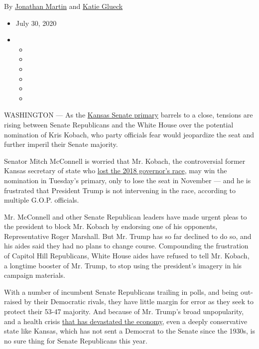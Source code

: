 By \href{https://www.nytimes3xbfgragh.onion/by/jonathan-martin}{Jonathan
Martin} and
\href{https://www.nytimes3xbfgragh.onion/by/katie-glueck}{Katie Glueck}

\begin{itemize}
\item
  July 30, 2020
\item
  \begin{itemize}
  \item
  \item
  \item
  \item
  \item
  \item
  \end{itemize}
\end{itemize}

WASHINGTON --- As the
\href{https://www.nytimes3xbfgragh.onion/2020/08/04/us/elections/primary-election-michigan-arizona-kansas.html}{Kansas
Senate primary} barrels to a close, tensions are rising between Senate
Republicans and the White House over the potential nomination of Kris
Kobach, who party officials fear would jeopardize the seat and further
imperil their Senate majority.

Senator Mitch McConnell is worried that Mr. Kobach, the controversial
former Kansas secretary of state who
\href{https://www.nytimes3xbfgragh.onion/2018/11/06/us/laura-kelly-wins-kansas-governors-race.html}{lost
the 2018 governor's race}, may win the nomination in Tuesday's primary,
only to lose the seat in November --- and he is frustrated that
President Trump is not intervening in the race, according to multiple
G.O.P. officials.

Mr. McConnell and other Senate Republican leaders have made urgent pleas
to the president to block Mr. Kobach by endorsing one of his opponents,
Representative Roger Marshall. But Mr. Trump has so far declined to do
so, and his aides said they had no plans to change course. Compounding
the frustration of Capitol Hill Republicans, White House aides have
refused to tell Mr. Kobach, a longtime booster of Mr. Trump, to stop
using the president's imagery in his campaign materials.

With a number of incumbent Senate Republicans trailing in polls, and
being out-raised by their Democratic rivals, they have little margin for
error as they seek to protect their 53-47 majority. And because of Mr.
Trump's broad unpopularity, and a health crisis
\href{https://www.nytimes3xbfgragh.onion/2020/07/30/business/economy/q2-gdp-coronavirus-economy.html?action=click\&module=Top\%20Stories\&pgtype=Homepage}{that
has devastated the economy}, even a deeply conservative state like
Kansas, which has not sent a Democrat to the Senate since the 1930s, is
no sure thing for Senate Republicans this year.

